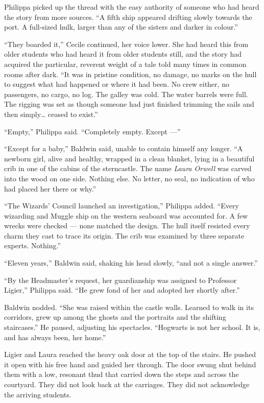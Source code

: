 Philippa picked up the thread with the easy authority of someone who had heard the story from more sources. \enquote{A fifth ship appeared drifting slowly towards the port. A full-sized hulk, larger than any of the sisters and darker in colour.}

\enquote{They boarded it,} Cecile continued, her voice lower. She had heard this from older students who had heard it from older students still, and the story had acquired the particular, reverent weight of a tale told many times in common rooms after dark. \enquote{It was in pristine condition, no damage, no marks on the hull to suggest what had happened or where it had been. No crew either, no passengers, no cargo, no log. The galley was cold. The water barrels were full. The rigging was set as though someone had just finished trimming the sails and then simply\ldots{} ceased to exist.}

\enquote{Empty,} Philippa said. \enquote{Completely empty. Except ---}

\enquote{Except for a baby,} Baldwin said, unable to contain himself any longer. \enquote{A newborn girl, alive and healthy, wrapped in a clean blanket, lying in a beautiful crib in one of the cabins of the sterncastle. The name \textit{Laura Orwell} was carved into the wood on one side. Nothing else. No letter, no seal, no indication of who had placed her there or why.}

\enquote{The Wizards' Council launched an investigation,} Philippa added. \enquote{Every wizarding and Muggle ship on the western seaboard was accounted for. A few wrecks were checked --- none matched the design. The hull itself resisted every charm they cast to trace its origin. The crib was examined by three separate experts. Nothing.}

\enquote{Eleven years,} Baldwin said, shaking his head slowly, \enquote{and not a single answer.}

\enquote{By the Headmaster's request, her guardianship was assigned to Professor Ligier,} Philippa said. \enquote{He grew fond of her and adopted her shortly after.}

Baldwin nodded. \enquote{She was raised within the castle walls. Learned to walk in its corridors, grew up among the ghosts and the portraits and the shifting staircases.} He paused, adjusting his spectacles. \enquote{Hogwarts is not her school. It is, and has always been, her home.}

Ligier and Laura reached the heavy oak door at the top of the stairs. He pushed it open with his free hand and guided her through. The door swung shut behind them with a low, resonant thud that carried down the steps and across the courtyard. They did not look back at the carriages. They did not acknowledge the arriving students.

